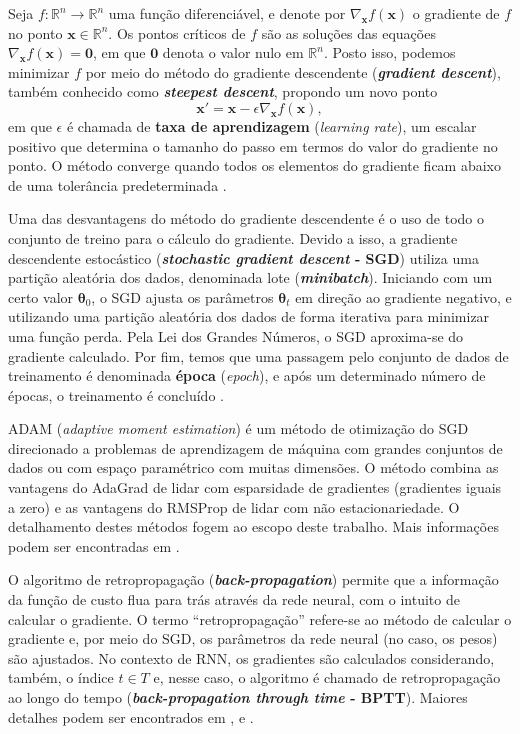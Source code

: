 \documentclass{automatextcc}
\newcommand{\R}{\mathds{R}}
\newcommand{\bs}[1]{\boldsymbol{#1}}
\begin{document}
Seja $f: \R^n \rightarrow \R^n$ uma função diferenciável, e denote por $\nabla_{\bs{x}} f(\bs{x})$ o gradiente de $f$ no ponto $\bs{x}\in\R^n$. Os pontos críticos de $f$ são as soluções das equações $\nabla_{\bs{x}} f(\bs{x}) = \bs{0}$, em que $\bs{0}$ denota o valor nulo em $\R^n$. Posto isso, podemos minimizar $f$ por meio do método  do gradiente descendente (\textit{\textbf{gradient descent}}), também conhecido como \textit{\textbf{steepest descent}}, propondo um novo ponto
\begin{equation*}
    \bs{x'} = \bs{x} - \epsilon \nabla_{\bs{x}} f(\bs{x}),
\end{equation*}
em que $\epsilon$ é chamada de \textbf{taxa de aprendizagem} (\textit{learning rate}), um escalar positivo que determina o tamanho do passo em termos do valor do gradiente no ponto. O método converge quando todos os elementos do gradiente ficam abaixo de uma tolerância predeterminada \citep{goodfellow2016}. 

Uma das desvantagens  do método do gradiente descendente é o uso de todo o conjunto de treino para o cálculo do gradiente. Devido a isso, a  gradiente descendente estocástico (\textbf{\textit{stochastic gradient descent} - SGD}) utiliza uma partição aleatória dos dados, denominada lote (\textbf{\textit{minibatch}}). Iniciando com um certo valor $\bs{\theta}_0$, o SGD ajusta os parâmetros $\bs{\theta}_t$ em direção ao gradiente negativo, e utilizando uma partição aleatória dos dados de forma iterativa para minimizar uma função perda. Pela Lei dos Grandes Números, o SGD aproxima-se do gradiente calculado. Por fim, temos que uma passagem pelo conjunto de dados de treinamento é denominada \textbf{época} (\textit{epoch}), e após um determinado número de épocas, o treinamento é concluído \citep{goodfellow2016, kamath2019, fan2021}. 

ADAM (\textit{adaptive moment estimation}) é um método de otimização do SGD direcionado a problemas de aprendizagem de máquina com grandes conjuntos de dados ou com espaço paramétrico com muitas dimensões. O método combina as vantagens do AdaGrad \citep{duchi2011} de lidar com esparsidade de gradientes (gradientes iguais a zero) e as vantagens do RMSProp \citep{tieleman2012} de lidar com não estacionariedade. O detalhamento destes métodos fogem ao escopo deste trabalho. Mais informações podem ser encontradas em \citet{kingma2014}.

O algoritmo de retropropagação (\textbf{\textit{back-propagation}}) permite que a informação da função de custo flua para trás através da rede neural, com o intuito de calcular o gradiente. O termo ``retropropagação'' refere-se ao método de calcular o gradiente e, por meio do SGD, os parâmetros da rede neural (no caso, os pesos) são ajustados. No contexto de RNN, os gradientes são calculados considerando, também, o índice $t \in T$ e, nesse caso, o algoritmo é chamado de retropropagação ao longo do tempo (\textbf{\textit{back-propagation through time} - BPTT}). Maiores detalhes podem ser encontrados em \citet{haykin2009}, \citet{goodfellow2016} e \citet{fan2021}.  
\end{document}
